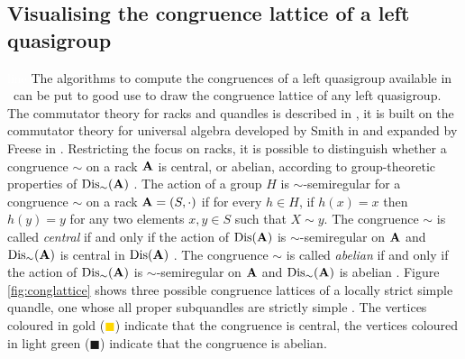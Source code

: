 \documentclass{mcom-l}
\begin{document}
\subsection{Visualising the congruence lattice of a left quasigroup}\textcolor{white}{line}\newline
\noindent The algorithms to compute the congruences of a left quasigroup available in \Software~can be put to good use to draw the congruence lattice of any left quasigroup. The commutator theory for racks and quandles is described in \cite{BonStanCommTheory2021}, it is built on the commutator theory for universal algebra developed by Smith in \cite{smith1976varieties} and expanded by Freese in \cite{freese1987commutator}. Restricting the focus on racks, it is possible to distinguish whether a congruence $\sim$ on a rack $\mathbf{A}$ is central, or abelian, according to group-theoretic properties of $\operatorname{Dis}_\sim(\mathbf{A})$ \cite{BonStanCommTheory2021}. The action of a group $H$ is $\sim$-semiregular for a congruence $\sim$ on a rack $\mathbf{A} = (S, \cdot)$ if for every $h\in H$, if $h(x) = x$ then $h(y)=y$ for any two elements $x,y \in S$ such that $X\sim y$. The congruence $\sim$ is called \emph{central} if and only if the action of $\operatorname{Dis}(\mathbf{A})$ is $\sim$-semiregular on $\mathbf{A}$ and $\operatorname{Dis}_\sim(\mathbf{A})$ is central in $\operatorname{Dis}(\mathbf{A})$ \cite{BonStanCommTheory2021}. The congruence $\sim$ is called \emph{abelian} if and only if the action of $\operatorname{Dis}_\sim(\mathbf{A})$ is $\sim$-semiregular on $\mathbf{A}$ and $\operatorname{Dis}_\sim(\mathbf{A})$ is abelian \cite{BonStanCommTheory2021}. Figure \ref{fig:conglattice} shows three possible congruence lattices of a locally strict simple quandle, one whose all proper subquandles are strictly simple \cite{bonatto2022connected}. The vertices coloured in gold (\textcolor{gold}{$\blacksquare$}) indicate that the congruence is central, the vertices coloured in light green (\textcolor{olivedrab1}{$\blacksquare$}) indicate that the congruence is abelian.
\end{document}
